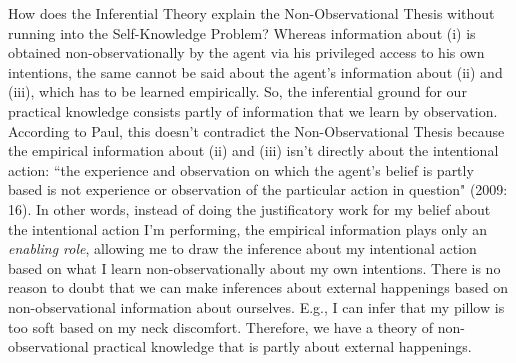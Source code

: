 \documentclass[a4paper,12pt]{article}
\begin{document}

How does the Inferential Theory explain the Non-Observational Thesis without running into the Self-Knowledge Problem? Whereas information about (i) is obtained non-observationally by the agent via his privileged access to his own intentions, the same cannot be said about the agent's information about (ii) and (iii), which has to be learned empirically. So, the inferential ground for our practical knowledge consists partly of information that we learn by observation. According to Paul, this doesn't contradict the Non-Observational Thesis because the empirical information about (ii) and (iii) isn't directly about the intentional action: ``the experience and observation on which the agent's belief is partly based is not experience or observation of the particular action in question" (2009: 16). In other words, instead of doing the justificatory work for my belief about the intentional action I'm performing, the empirical information plays only an \emph{enabling role}, allowing me to draw the inference about my intentional action based on what I learn non-observationally about my own intentions. There is no reason to doubt that we can make inferences about external happenings based on non-observational information about ourselves. E.g., I can infer that my pillow is too soft based on my neck discomfort. Therefore, we have a theory of non-observational practical knowledge that is partly about external happenings.
\end{document}
